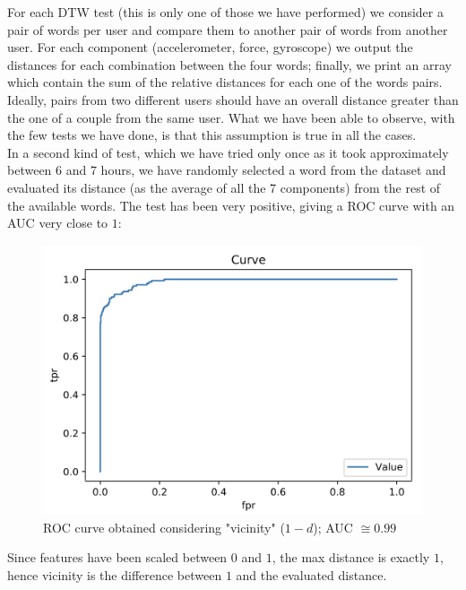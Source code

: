 \documentclass[8pt,notitlepage]{report}
\begin{document}
			For each DTW test (this is only one of those we have performed) we consider a pair of words per user and compare them to another pair of words from another user. For each component (accelerometer, force, gyroscope) we output the distances for each combination between the four words; finally, we print an array which contain the sum of the relative distances for each one of the words pairs.  \\
			Ideally, pairs from two different users should have an overall distance greater than the one of a couple from the same user. What we have been able to observe, with the few tests we have done, is that this assumption is true in all the cases. \\
			In a second kind of test, which we have tried only once as it took approximately between 6 and 7 hours, we have randomly selected a word from the dataset and evaluated its distance (as the average of all the 7 components) from the rest of the available words. The test has been very positive, giving a ROC curve with an AUC very close to $ 1 $:
			
			\begin{figure}[H]
				\begin{center}
					\includegraphics[scale=.4]{ROC_DTW_Antonio}
					\caption{ROC curve obtained considering "vicinity" ($ 1 - d $); AUC $ \cong 0.99 $}
				\end{center}
			\end{figure}
			
			Since features have been scaled between $ 0 $ and $ 1 $, the max distance is exactly $ 1 $, hence vicinity is the difference between $ 1 $ and the evaluated distance.
			
\end{document}

